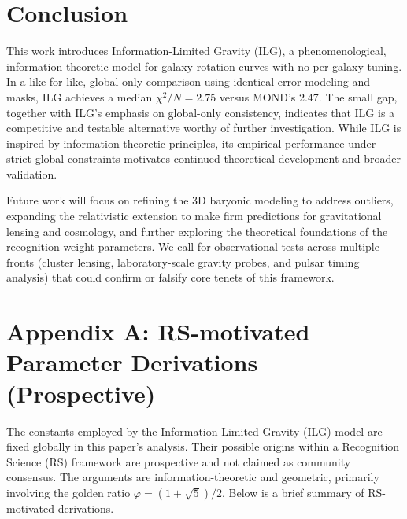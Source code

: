 \documentclass[usenatbib]{mnras}
\begin{document}
\section{Conclusion}

This work introduces Information-Limited Gravity (ILG), a phenomenological, information-theoretic model for galaxy rotation curves with no per-galaxy tuning. In a like-for-like, global-only comparison using identical error modeling and masks, ILG achieves a median $\chi^2/N = 2.75$ versus MOND's 2.47. The small gap, together with ILG's emphasis on global-only consistency, indicates that ILG is a competitive and testable alternative worthy of further investigation.
While ILG is inspired by information-theoretic principles, its empirical performance under strict global constraints motivates continued theoretical development and broader validation.

Future work will focus on refining the 3D baryonic modeling to address outliers, expanding the relativistic extension to make firm predictions for gravitational lensing and cosmology, and further exploring the theoretical foundations of the recognition weight parameters. We call for observational tests across multiple fronts (cluster lensing, laboratory-scale gravity probes, and pulsar timing analysis) that could confirm or falsify core tenets of this framework.

\appendix
\section*{Appendix A: RS-motivated Parameter Derivations (Prospective)}

The constants employed by the Information-Limited Gravity (ILG) model are fixed globally in this paper's analysis. Their possible origins within a Recognition Science (RS) framework are prospective and not claimed as community consensus. The arguments are information-theoretic and geometric, primarily involving the golden ratio $\varphi = (1+\sqrt{5})/2$. Below is a brief summary of RS-motivated derivations.
\end{document}
